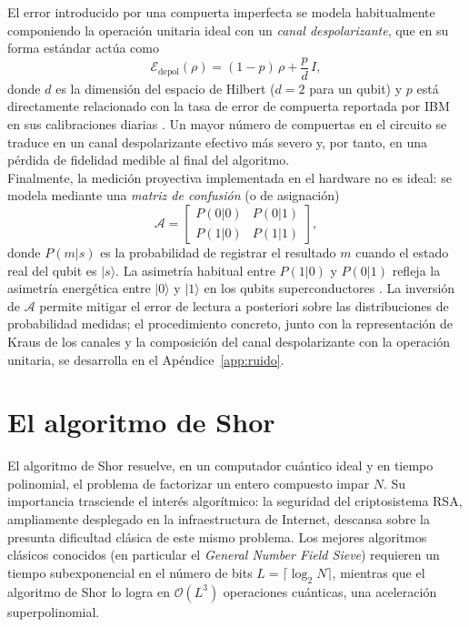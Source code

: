 \documentclass[12pt, spanish]{book}
\begin{document}
El error introducido por una compuerta imperfecta se modela habitualmente componiendo la operación unitaria ideal con un \textit{canal despolarizante}, que en su forma estándar actúa como
\begin{equation}
    \mathcal{E}_{\text{depol}}(\rho) = (1-p)\,\rho + \frac{p}{d}\,I,
    \label{eq:canal_despolarizante}
\end{equation}
donde $d$ es la dimensión del espacio de Hilbert ($d=2$ para un qubit) y $p$ está directamente relacionado con la tasa de error de compuerta reportada por IBM en sus calibraciones diarias \cite{Nielsen2024, AbuGhanem2025}. Un mayor número de compuertas en el circuito se traduce en un canal despolarizante efectivo más severo y, por tanto, en una pérdida de fidelidad medible al final del algoritmo.\\
 
Finalmente, la medición proyectiva implementada en el hardware no es ideal: se modela mediante una \textit{matriz de confusión} (o de asignación) \cite{IBM_noise_models}
\begin{equation}
    \mathcal{A} = \begin{bmatrix} P(0|0) & P(0|1) \\ P(1|0) & P(1|1) \end{bmatrix},
    \label{eq:matriz_confusion}
\end{equation}
donde $P(m|s)$ es la probabilidad de registrar el resultado $m$ cuando el estado real del qubit es $|s\rangle$. La asimetría habitual entre $P(1|0)$ y $P(0|1)$ refleja la asimetría energética entre $|0\rangle$ y $|1\rangle$ en los qubits superconductores \cite{Preskill, DeCusatis2021}. La inversión de $\mathcal{A}$ permite mitigar el error de lectura a posteriori sobre las distribuciones de probabilidad medidas; el procedimiento concreto, junto con la representación de Kraus de los canales y la composición del canal despolarizante con la operación unitaria, se desarrolla en el Apéndice~\ref{app:ruido}.

\section{El algoritmo de Shor}

El algoritmo de Shor \cite{Shor1994} resuelve, en un computador cuántico ideal y en tiempo polinomial, el problema de factorizar un entero compuesto impar $N$. Su importancia trasciende el interés algorítmico: la seguridad del criptosistema RSA, ampliamente desplegado en la infraestructura de Internet, descansa sobre la presunta dificultad clásica de este mismo problema. Los mejores algoritmos clásicos conocidos (en particular el \textit{General Number Field Sieve}) requieren un tiempo subexponencial en el número de bits $L = \lceil \log_2 N \rceil$, mientras que el algoritmo de Shor lo logra en $\mathcal{O}(L^3)$ operaciones cuánticas, una aceleración superpolinomial.\\
\end{document}
